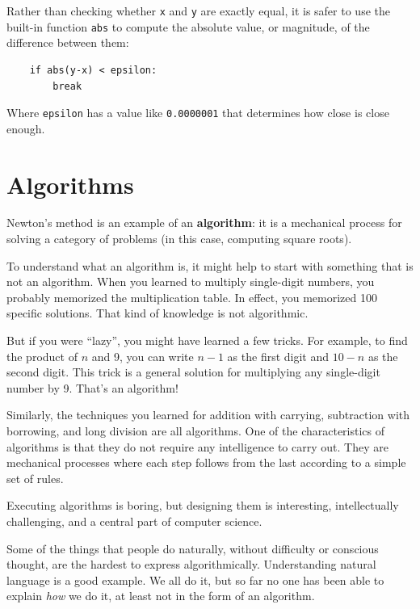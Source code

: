 \documentclass[10pt]{book}
\begin{document}
Rather than checking whether {\tt x} and {\tt y} are exactly equal, it
is safer to use the built-in function {\tt abs} to compute the
absolute value, or magnitude, of the difference between them:

\begin{verbatim}
    if abs(y-x) < epsilon:
        break
\end{verbatim}
%
Where \verb"epsilon" has a value like {\tt 0.0000001} that
determines how close is close enough.


\section{Algorithms}

Newton's method is an example of an {\bf algorithm}: it is a
mechanical process for solving a category of problems (in this
case, computing square roots).

To understand what an algorithm is, it might help to start with
something that is not an algorithm.  When you learned to multiply
single-digit numbers, you probably memorized the multiplication table.
In effect, you memorized 100 specific solutions.  That kind of
knowledge is not algorithmic.

But if you were ``lazy'', you might have learned a few
tricks.  For example, to find the product of $n$ and 9, you can
write $n-1$ as the first digit and $10-n$ as the second
digit.  This trick is a general solution for multiplying any
single-digit number by 9.  That's an algorithm!

Similarly, the techniques you learned for addition with carrying,
subtraction with borrowing, and long division are all algorithms.  One
of the characteristics of algorithms is that they do not require any
intelligence to carry out.  They are mechanical processes where
each step follows from the last according to a simple set of rules.

Executing algorithms is boring, but designing them is interesting,
intellectually challenging, and a central part of computer science.

Some of the things that people do naturally, without difficulty or
conscious thought, are the hardest to express algorithmically.
Understanding natural language is a good example.  We all do it, but
so far no one has been able to explain {\em how} we do it, at least
not in the form of an algorithm.
\end{document}

